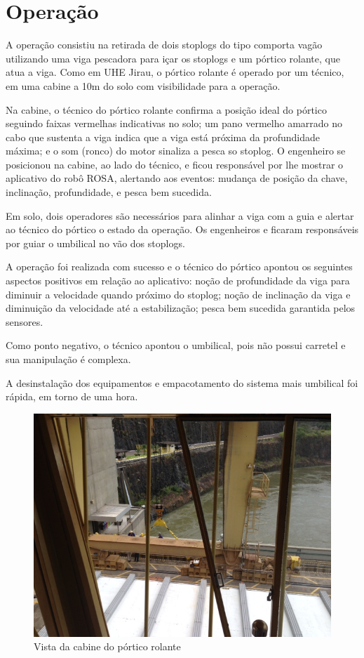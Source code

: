 \section{Operação}

A operação consistiu na retirada de dois stoplogs do tipo comporta vagão
utilizando uma viga pescadora para içar os stoplogs e um pórtico rolante, que
atua a viga. Como em UHE Jirau, o pórtico rolante é operado por um técnico, em
uma cabine a 10m do solo com visibilidade para a operação. 

Na cabine, o técnico do pórtico rolante confirma a posição
ideal do pórtico seguindo faixas vermelhas indicativas no solo; um
pano vermelho amarrado no cabo que sustenta a viga indica que a viga está
próxima da profundidade máxima; e o som (ronco) do motor sinaliza a pesca so
stoplog. O engenheiro \renan se posicionou na cabine, ao lado do técnico, e
ficou responsável por lhe mostrar o aplicativo do robô ROSA,
alertando aos eventos: mudança de posição da chave, inclinação, profundidade, e
pesca bem sucedida.

Em solo, dois operadores são necessários para alinhar a viga com a guia e
alertar ao técnico do pórtico o estado da operação. Os engenheiros \estevao e
\sylvain ficaram responsáveis por guiar o umbilical no vão dos stoplogs.

A operação foi realizada com sucesso e o técnico do pórtico apontou os seguintes
aspectos positivos em relação ao aplicativo: noção de profundidade da viga para diminuir
a velocidade quando próximo do stoplog; noção de inclinação da viga e
diminuição da velocidade até a estabilização; pesca bem sucedida garantida pelos
sensores.

Como ponto negativo, o técnico apontou o umbilical, pois não possui carretel e
sua manipulação é complexa.

A desinstalação dos equipamentos e empacotamento do sistema mais umbilical foi
rápida, em torno de uma hora.

\begin{figure}[h]
\centering
	\includegraphics[width=0.9\columnwidth]{figs/IMG_2005.JPG}
	\caption{Vista da cabine do pórtico rolante}
	\label{fig::cabine1}
\end{figure}


